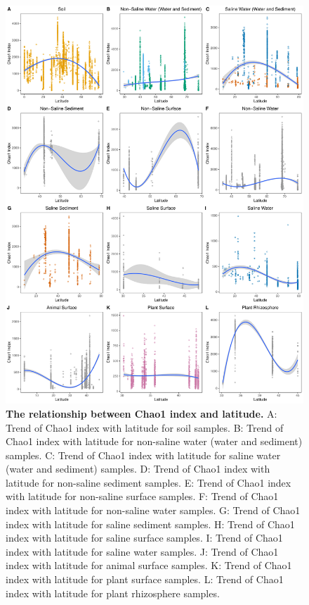 \begin{figure}[H]
    \centering
    \includegraphics[scale=0.33]{./Figures/Chao_lati_empo3}
    \caption{\textbf{The relationship between Chao1 index and latitude.} A: Trend of Chao1 index with latitude for soil samples. B: Trend of Chao1 index with latitude for non-saline water (water and sediment) samples. C: Trend of Chao1 index with latitude for saline water (water and sediment) samples. D: Trend of Chao1 index with latitude for non-saline sediment samples. E: Trend of Chao1 index with latitude for non-saline surface samples. F: Trend of Chao1 index with latitude for non-saline water samples. G: Trend of Chao1 index with latitude for saline sediment samples. H: Trend of Chao1 index with latitude for saline surface samples. I: Trend of Chao1 index with latitude for saline water samples. J: Trend of Chao1 index with latitude for animal surface samples. K: Trend of Chao1 index with latitude for plant surface samples. L: Trend of Chao1 index with latitude for plant rhizosphere samples.}
    \label{fig:Chao_lati3}
\end{figure}

